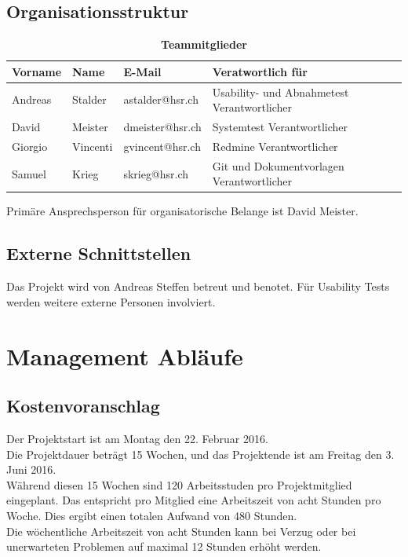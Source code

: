 \documentclass[a4,12pt]{scrartcl}
\begin{document}
\subsection{Organisationsstruktur}
\begin{table}[H]
\centering
    \begin{tabular}{@{} l l l l@{}}    
    {Vorname} & {Name} & {E-Mail} & Veratwortlich für\\ \midrule
    Andreas & Stalder & astalder@hsr.ch & Usability- und Abnahmetest Verantwortlicher\\ \addlinespace
    David & Meister & dmeister@hsr.ch & Systemtest Verantwortlicher\\ \addlinespace
    Giorgio & Vincenti & gvincent@hsr.ch & Redmine Verantwortlicher\\ \addlinespace
    Samuel & Krieg & skrieg@hsr.ch & Git und Dokumentvorlagen Verantwortlicher\\
    \bottomrule
    \end{tabular}
\caption{\textbf{Teammitglieder}}
\end{table} 

Primäre Ansprechsperson für organisatorische Belange ist David Meister.
\subsection{Externe Schnittstellen}
Das Projekt wird von Andreas Steffen betreut und benotet. Für Usability Tests werden weitere externe Personen involviert.

\section{Management Abläufe}
\subsection{Kostenvoranschlag}
Der Projektstart ist am Montag den 22. Februar 2016. \\
Die Projektdauer beträgt 15 Wochen, und das Projektende ist am Freitag den 3. Juni 2016. \\


\noindent Während diesen 15 Wochen sind 120 Arbeitsstuden pro Projektmitglied eingeplant. Das entspricht pro Mitglied eine Arbeitszeit von acht Stunden pro Woche. Dies ergibt einen totalen Aufwand von 480 Stunden.\\

\noindent Die wöchentliche Arbeitszeit von acht Stunden kann bei Verzug oder bei unerwarteten Problemen auf maximal 12 Stunden erhöht werden. \\
\end{document}
